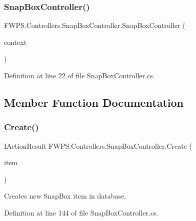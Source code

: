 \subsubsection{\texorpdfstring{Snap\+Box\+Controller()}{SnapBoxController()}}
{\footnotesize\ttfamily F\+W\+P\+S.\+Controllers.\+Snap\+Box\+Controller.\+Snap\+Box\+Controller (\begin{DoxyParamCaption}\item[{\mbox{\hyperlink{class_f_w_p_s_1_1_data_1_1_fwps_db_context}{Fwps\+Db\+Context}}}]{context }\end{DoxyParamCaption})}



Definition at line 22 of file Snap\+Box\+Controller.\+cs.



\subsection{Member Function Documentation}
\mbox{\label{class_f_w_p_s_1_1_controllers_1_1_snap_box_controller_a3ea0fbfa5763124116e9ca247affc883}} 
\subsubsection{\texorpdfstring{Create()}{Create()}}
{\footnotesize\ttfamily I\+Action\+Result F\+W\+P\+S.\+Controllers.\+Snap\+Box\+Controller.\+Create (\begin{DoxyParamCaption}\item[{\mbox{[}\+From\+Body\mbox{]} \mbox{\hyperlink{class_f_w_p_s_1_1_models_1_1_snap_box_item}{Snap\+Box\+Item}}}]{item }\end{DoxyParamCaption})}



Creates new Snap\+Box item in database. 



Definition at line 144 of file Snap\+Box\+Controller.\+cs.

\mbox{\label{class_f_w_p_s_1_1_controllers_1_1_snap_box_controller_aaf17f97e97bf3466ad307469ac8e6247}} 
